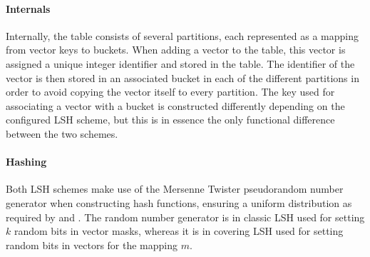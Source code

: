 \paragraph{Internals} Internally, the table consists of several partitions, each represented as a mapping from vector keys to buckets. When adding a vector to the table, this vector is assigned a unique integer identifier and stored in the table. The identifier of the vector is then stored in an associated bucket in each of the different partitions in order to avoid copying the vector itself to every partition. The key used for associating a vector with a bucket is constructed differently depending on the configured LSH scheme, but this is in essence the only functional difference between the two schemes.

\paragraph{Hashing} Both LSH schemes make use of the Mersenne Twister pseudorandom number generator when constructing hash functions, ensuring a uniform distribution as required by \cite{DBLP:conf/stoc/IndykM98} and \cite{DBLP:journals/corr/Pagh15}. The random number generator is in classic LSH used for setting $k$ random bits in vector masks, whereas it is in covering LSH used for setting random bits in vectors for the mapping $m$.
